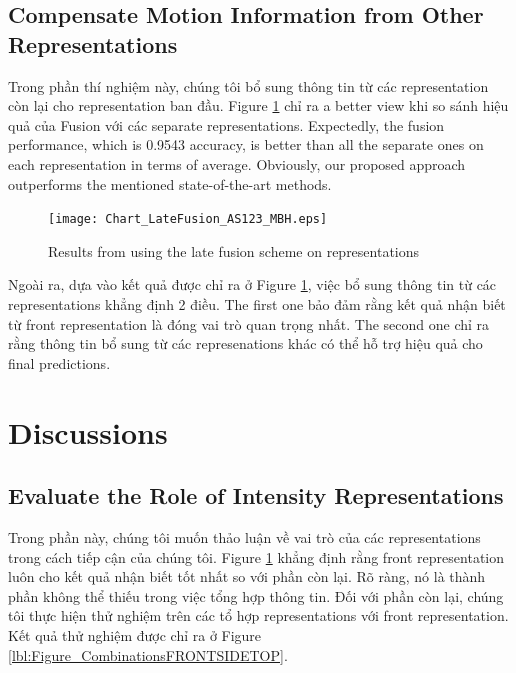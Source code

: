\documentclass[review]{elsarticle}
\begin{document}
\subsection{Compensate Motion Information from Other Representations}
 
 Trong phần thí nghiệm này, chúng tôi bổ sung thông tin từ các representation còn lại cho representation ban đầu. Figure \ref{lbl:Figure_LateFusion_AS123_MBH} chỉ ra a better view khi so sánh hiệu quả của Fusion với các separate representations. Expectedly, the fusion performance, which is 0.9543 accuracy, is better than all the separate ones on each representation in terms of average. Obviously, our proposed approach outperforms the mentioned state-of-the-art methods.
 
 \begin{figure}[H]
 	\begin{center}
 		\texttt{[image: Chart\_LateFusion\_AS123\_MBH.eps]}
 	\end{center}
 	\caption{\label{lbl:Figure_LateFusion_AS123_MBH}Results from using the late fusion scheme on representations}
 \end{figure}
 
Ngoài ra, dựa vào kết quả được chỉ ra ở Figure \ref{lbl:Figure_LateFusion_AS123_MBH}, việc bổ sung thông tin từ các representations khẳng định 2 điều. The first one bảo đảm rằng kết quả nhận biết từ front representation là đóng vai trò quan trọng nhất. The second one chỉ ra rằng thông tin bổ sung từ các represenations khác có thể hỗ trợ hiệu quả cho final predictions.

\section{Discussions}

\subsection{Evaluate the Role of Intensity Representations}

Trong phần này, chúng tôi muốn thảo luận về vai trò của các representations trong cách tiếp cận của chúng tôi. Figure \ref{lbl:Figure_LateFusion_AS123_MBH} khẳng định rằng front representation luôn cho kết quả nhận biết tốt nhất so với phần còn lại. Rõ ràng, nó là thành phần không thể thiếu trong việc tổng hợp thông tin. Đối với phần còn lại, chúng tôi thực hiện thử nghiệm trên các tổ hợp representations với front representation. Kết quả thử nghiệm được chỉ ra ở Figure \ref{lbl:Figure_CombinationsFRONTSIDETOP}.
\end{document}
